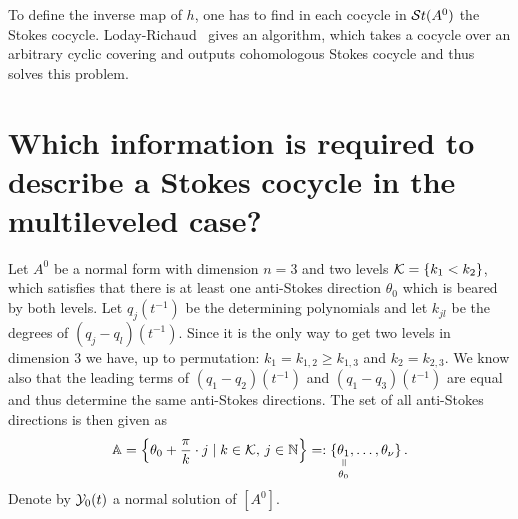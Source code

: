 \begin{comment}
  \marginnote{\cite[880f]{Loday1994}}
  We have also two structures of a linear affine variety on the set $\St(A^0)$.
  \begin{rem}
    Let $\sto_\theta(A^0)$ be the Lie algebra corresponding to
    $\Sto_\theta(A^0)$. The exponential map\footnote{This is not the map $\exp$
    from section~\ref{sec:mainThm1}.} induces an homomorphism
    $\exp:\sto_\theta(A^0)\to\Sto_\theta(A^0)$ and denote by $\ln=\exp^{-1}$
    the inverse map.
    \begin{enumerate}
      \item The \emph{tangent linear structure} is defined as \TODO
      \item Using the map
        \begin{align*}
          \sto_{\theta}(A^0) &\overset{\id+\cdot}\longrightarrow
          \Sto_{\theta}(A^0)
        \\\dot{f}_\theta & \longmapsto \id+\dot{f}_\theta \,.
        \end{align*}
    \end{enumerate}
  \end{rem}
\end{comment}

\begin{rem}
  To define the inverse map of $h$, one has to find in each cocycle in
  $\mathcal{S}{}t(A^0)$ the Stokes cocycle. Loday-Richaud~\cite[section~II.3.4]{Loday1994}
  gives an algorithm, which takes a cocycle over an arbitrary cyclic covering
  and outputs cohomologous Stokes cocycle and thus solves this problem.
\end{rem}

\section{Which information is required to describe a Stokes cocycle in the
  multileveled case?}\label{sec:WhichInformationIsNeeded}
Let $A^0$ be a normal form with dimension $n=3$ and two levels
$\mathcal{K}=\{k_1<k_2\}$, which satisfies that there is at least one anti-Stokes
direction $\theta_0$ which is beared by both levels.
Let $q_j(t^{-1})$ be the determining polynomials and let $k_{jl}$ be the
degrees of $(q_j-q_l)(t^{-1})$.
Since it is the only way to get two levels in dimension $3$ we have, up to
permutation: $k_1=k_{1,2}\geq k_{1,3}$ and $k_2=k_{2,3}$.
We know also that the leading terms of $(q_1-q_2)(t^{-1})$ and
$(q_1-q_3)(t^{-1})$ are equal and thus determine the same anti-Stokes
directions.
The set of all anti-Stokes directions is then given as
\[
  \A=\left\{\theta_0+\frac{\pi}{k}\cdot j\mid k\in\cK\text{, }j\in\N\right\}
    =:\{
      \underset{\theta_0}{%
        \underset{\text{\rotatebox[origin=c]{-90}{$=$}}}{%
          \theta_1
      }}
    ,\dots,\theta_\nu\}\,.
\]
Denote by $\mathcal{Y}_0(t)$ a normal solution of $[A^0]$.

